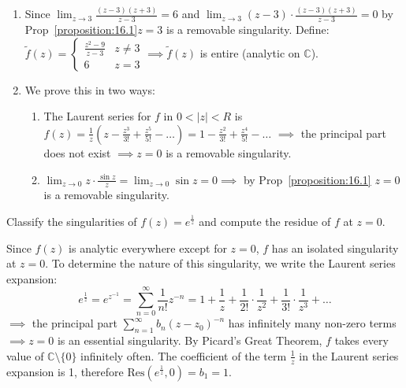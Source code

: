 \begin{soln}
    \begin{enumerate}
        \item Since $\lim_{z \to 3} \frac{(z-3)(z+3)}{z-3} = 6$ and $\lim_{z \to 3} (z-3) \cdot \frac{(z-3)(z+3)}{z-3} = 0$ by Prop~\ref{proposition:16.1}$z = 3$ is a removable singularity. 
        Define: $\tilde{f}(z) = \begin{cases} \frac{z^2 - 9}{z-3} & z \neq 3 \\ 6 & z = 3 \end{cases} \implies \tilde{f}(z)$ is entire (analytic on $\mathbb{C}$).
        \item We prove this in two ways:
        \begin{enumerate}[label=\roman*)]
            \item The Laurent series for $f$ in $0 < |z| < R$ is $f(z) = \frac{1}{z}(z - \frac{z^3}{3!} + \frac{z^5}{5!} - \dots) = 1 - \frac{z^2}{3!} + \frac{z^4}{5!} - \dots$ $\implies$ the 
            principal part does not exist $\implies z = 0$ is a removable singularity.
            \item $\lim_{z \to 0} z \cdot \frac{\sin z}{z} = \lim_{z \to 0} \sin z = 0 \implies$ by Prop~\ref{proposition:16.1} $z = 0$ is a removable singularity.
        \end{enumerate}
    \end{enumerate}
\end{soln}

\begin{example}\label{example:18.3} Classify the singularities of $f(z) = e^{\frac{1}{z}}$ and compute the residue of $f$ at $z = 0$.
\begin{soln}
    
    Since $f(z)$ is analytic everywhere except for $z = 0$, $f$ has an isolated singularity at $z = 0$. To determine the nature of this singularity, we write the Laurent series expansion: 
    \[ e^{\frac{1}{z}} = e^{z^{-1}} = \sum_{n=0}^{\infty} \frac{1}{n!} z^{-n} = 1 + \frac{1}{z} + \frac{1}{2!} \cdot \frac{1}{z^2} + \frac{1}{3!} \cdot \frac{1}{z^3} + \dots\]
    $\implies$ the principal part $\sum_{n=1}^{\infty} b_n (z - z_0)^{-n}$ has infinitely many non-zero terms $\implies z = 0$ is an essential singularity. 
    By Picard's Great Theorem, $f$ takes every value of $\mathbb{C} \setminus \{0\}$ infinitely often. The coefficient of the term $\frac{1}{z}$ in the Laurent series expansion is 1, therefore $\text{Res}(e^{\frac{1}{z}}, 0) = b_1 = 1$.
\end{soln}
\end{example}
